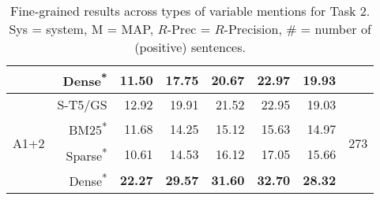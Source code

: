 \documentclass[11pt]{article}
\begin{document}
\begin{table*}[]
\begin{tabular}{l|r|r|r|r|r|r|c}
        &    Dense\textsuperscript{*} &  \textbf{11.50} &  \textbf{17.75} &   \textbf{20.67} &   \textbf{22.97} &        \textbf{19.93} &        \\
    \hline
    \hline
       \multirow{4}{4em}{A1+2} &    S-T5/GS &  12.92 &  19.91 &   21.52 &   22.95 &        19.03 &      \multirow{4}{2em}{273} \\
        &    BM25\textsuperscript{*} &  11.68 &  14.25 &   15.12 &   15.63 &        14.97 &       \\
        &    Sparse\textsuperscript{*} &  10.61 &  14.53 &   16.12 &   17.05 &        15.66 &       \\
        &    Dense\textsuperscript{*} &  \textbf{22.27} &  \textbf{29.57} &   \textbf{31.60} &   \textbf{32.70} &        \textbf{28.32} &       \\
    \hline
    \end{tabular}
    \caption{Fine-grained results across types of variable mentions for Task 2. Sys = system, M = MAP, $R$-Prec = $R$-Precision, \# = number of (positive) sentences.}
    \label{tab:T2-Ann12}
\end{table*}
\end{document}
